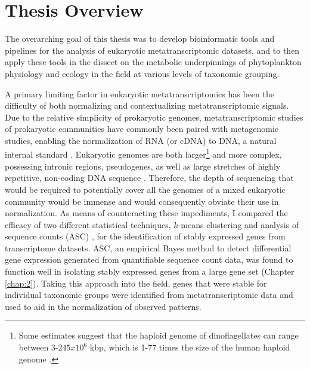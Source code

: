 \section{Thesis Overview}
The overarching goal of this thesis was to develop bioinformatic tools and pipelines for the analysis of eukaryotic metatranscriptomic datasets, and to then apply these tools in the dissect on the metabolic underpinnings of phytoplankton physiology and ecology in the field at various levels of taxonomic grouping. \par

A primary limiting factor in eukaryotic metatranscriptomics has been the difficulty of both normalizing and contextualizing metatranscriptomic signals. Due to the relative simplicity of prokaryotic genomes, metatranscriptomic studies of prokaryotic communities have commonly been paired with metagenomic studies, enabling the normalization of RNA (or cDNA) to DNA, a natural internal standard \citep{Frias-Lopez2008, McCarren2010, Shi2011}. Eukaryotic genomes are both larger\footnote{Some estimates suggest that the haploid genome of dinoflagellates can range between 3-$245 x 10^6$ kbp, which is 1-77 times the size of  the human haploid genome \citep{Hou2009}.} and more complex, possessing intronic regions, pseudogenes, as well as large stretches of highly repetitive, non-coding DNA sequence \citep{Taft2007}. Therefore, the depth of sequencing that would be required to potentially cover all the genomes of a mixed eukaryotic community would be immense and would consequently obviate their use in normalization. As means of counteracting these impediments, I compared the efficacy of two different statistical techniques, $k$-means clustering \citep{Hartigan1979} and analysis of sequence counts (ASC) \citep{Wu2010}, for the identification of stably expressed genes from transcriptome datasets. ASC, an empirical Bayes method to detect differential gene expression generated from quantifiable sequence count data, was found to function well in isolating stably expressed genes from a large gene set (Chapter \ref{chap:2}). Taking this approach into the field, genes that were stable for individual taxonomic groups were identified from metatranscriptomic data and used to aid in the normalization of observed patterns. \par

